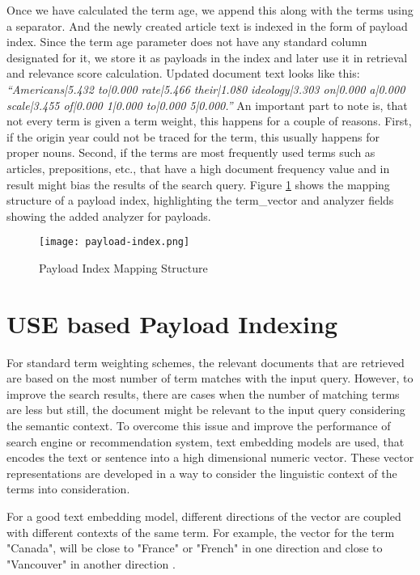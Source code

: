 Once we have calculated the term age, we append this along with the terms using a separator. And the newly created article text is indexed in the form of payload index. Since the term age parameter does not have any standard column designated for it, we store it as payloads in the index and later use it in retrieval and relevance score calculation. Updated document text looks like this: \textit{“Americans|5.432 to|0.000 rate|5.466 their|1.080 ideology|3.303 on|0.000 a|0.000 scale|3.455 of|0.000 1|0.000 to|0.000 5|0.000.” }
An important part to note is, that not every term is given a term weight, this happens for a couple of reasons. First, if the origin year could not be traced for the term, this usually happens for proper nouns. Second, if the terms are most frequently used terms such as articles, prepositions, etc., that have a high document frequency value and in result might bias the results of the search query. Figure \ref{fig:payload-index} shows the mapping structure of a payload index, highlighting the term\_vector and analyzer fields showing the added analyzer for payloads.

\begin{figure}[h!]
    \centering
    \texttt{[image: payload-index.png]}
    \caption{Payload Index Mapping Structure}
    \label{fig:payload-index}
\end{figure}

\section{USE based Payload Indexing}
For standard term weighting schemes, the relevant documents that are retrieved are based on the most number of term matches with the input query. However, to improve the search results, there are cases when the number of matching terms are less but still, the document might be relevant to the input query considering the semantic context. To overcome this issue and improve the performance of search engine or recommendation system, text embedding models are used, that encodes the text or sentence into a high dimensional numeric vector. These vector representations are developed in a way to consider the linguistic context of the terms into consideration. 

For a good text embedding model, different directions of the vector are coupled with different contexts of the same term. For example, the vector for the term "Canada", will be close to "France" or "French" in one direction and close to "Vancouver" in another direction \cite{julie2019USE}.

